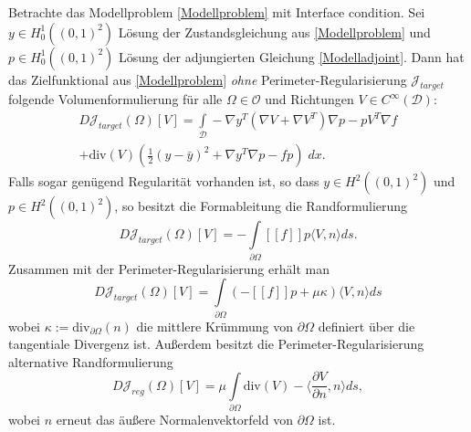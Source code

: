 \begin{theorem}
	Betrachte das Modellproblem \ref{Modellproblem} mit Interface condition. Sei $y\in H^1_0((0,1)^2)$ Lösung der Zustandsgleichung aus \ref{Modellproblem} und $p\in H^1_0((0,1)^2)$ Lösung der adjungierten Gleichung \ref{Modelladjoint}. Dann hat das Zielfunktional aus \ref{Modellproblem} \textit{ohne} Perimeter-Regularisierung $\mathcal{J}_{target}$ folgende Volumenformulierung für alle $\Omega \in \mathcal{O}$ und Richtungen $V \in C^\infty(\mathcal{D})$:
	\begin{equation}
	\begin{aligned}
		D\mathcal{J}_{target}(\Omega)[V] = \underset{\mathcal{D}}{\int} -\nabla y^T (\nabla V + \nabla V^T) \nabla p - p V^T \nabla f \\ + \text{div} (V) \left(\frac{1}{2}(y-\bar{y})^2 + \nabla y^T \nabla p - fp\right)\; dx.
	\end{aligned}
	\end{equation}
	Falls sogar genügend Regularität vorhanden ist, so dass $y \in H^2((0,1)^2)$ und $p \in H^2((0,1)^2)$, so besitzt die Formableitung die Randformulierung
	\begin{equation}
	D\mathcal{J}_{target}(\Omega)[V] = -\underset{\partial\Omega}{\int} [[f]]p \langle V,n \rangle ds.
	\end{equation}
	Zusammen mit der Perimeter-Regularisierung erhält man
	\begin{equation}
	D\mathcal{J}_{target}(\Omega)[V] = \underset{\partial\Omega}{\int} (-[[f]]p  + \mu\kappa )\langle V,n \rangle ds 
	\end{equation}
	wobei $\kappa := \text{div}_{\partial\Omega}(n)$ die mittlere Krümmung von $\partial\Omega$ definiert über die tangentiale Divergenz ist. Außerdem besitzt die Perimeter-Regularisierung alternative  Randformulierung
	\begin{equation}
	D\mathcal{J}_{reg}(\Omega)[V] = \mu\underset{\partial\Omega}{\int} \text{div}(V) - \langle\frac{\partial V}{\partial n}, n\rangle ds,
	\end{equation}
	wobei $n$ erneut das äußere Normalenvektorfeld von $\partial\Omega$ ist.
\end{theorem}

